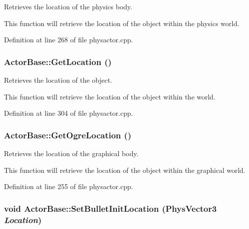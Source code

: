 Retrieves the location of the physics body. 

This function will retrieve the location of the object within the physics world. 

Definition at line 268 of file physactor.cpp.

\hypertarget{classActorBase_a9dfdaf0304e4a462b3b033fb254116af}{
\subsubsection[{GetLocation}]{ ActorBase::GetLocation ()}}
\label{dd/d7b/classActorBase_a9dfdaf0304e4a462b3b033fb254116af}


Retrieves the location of the object. 

This function will retrieve the location of the object within the world. 

Definition at line 304 of file physactor.cpp.

\hypertarget{classActorBase_a73ee03084b2ca78659b6e6439cafa75f}{
\subsubsection[{GetOgreLocation}]{ ActorBase::GetOgreLocation ()}}
\label{dd/d7b/classActorBase_a73ee03084b2ca78659b6e6439cafa75f}


Retrieves the location of the graphical body. 

This function will retrieve the location of the object within the graphical world. 

Definition at line 255 of file physactor.cpp.

\hypertarget{classActorBase_af52177760d530df2b0987ed8626a656d}{
\subsubsection[{SetBulletInitLocation}]{\setlength{\rightskip}{0pt plus 5cm}void ActorBase::SetBulletInitLocation ({\bf PhysVector3} {\em Location})}}
\label{dd/d7b/classActorBase_af52177760d530df2b0987ed8626a656d}



